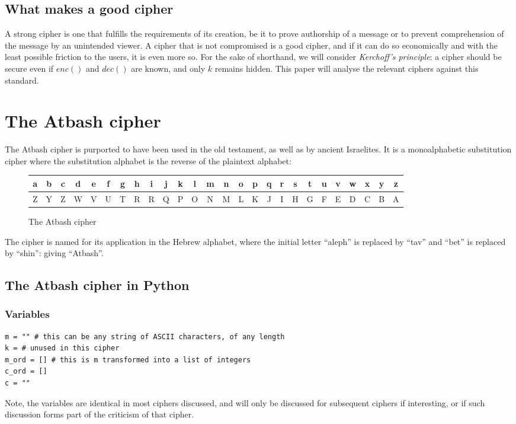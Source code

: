 \documentclass{AIAA}
\begin{document}
\subsection{What makes a good cipher}

A strong cipher is one that fulfills the requirements of its creation, be it to prove authorship of a message or to prevent comprehension of the message by an unintended viewer. A cipher that is not compromised is a good cipher, and if it can do so economically and with the least possible friction to the users, it is even more so. For the sake of shorthand, we will consider \textit{Kerchoff's principle}: a cipher should be secure even if $enc()$ and $dec()$ are known, and only $k$ remains hidden. This paper will analyse the relevant ciphers against this standard.



\section{The Atbash cipher}
The Atbash cipher is purported to have been used in the old testament, as well as by ancient Israelites. It is a monoalphabetic substitution cipher where the substitution alphabet is the reverse of the plaintext alphabet:

\begin{figure}[h!]
\begin{tabular}{|c|c|c|c|c|c|c|c|c|c|c|c|c|c|c|c|c|c|c|c|c|c|c|c|c|c|}
\hline
a & b & c & d & e & f & g & h & i & j & k & l & m & n & o & p & q & r & s & t & u & v & w & x & y & z \\ \hline
Z & Y & Z & W & V & U & T & R & R & Q & P & O & N & M & L & K & J & I & H & G & F & E & D & C & B & A \\
\hline
\end{tabular}
\caption{The Atbash cipher}
\end{figure}

The cipher is named for its application in the Hebrew alphabet, where the initial letter ``aleph'' is replaced by ``tav'' and ``bet'' is replaced by ``shin'': giving ``Atbash''. 

\subsection{The Atbash cipher in Python}

\subsubsection{Variables}
\begin{verbatim}
m = "" # this can be any string of ASCII characters, of any length
k = # unused in this cipher
m_ord = [] # this is m transformed into a list of integers
c_ord = []
c = ""
\end{verbatim}
Note, the variables are identical in most ciphers discussed, and will only be discussed for subsequent ciphers if interesting, or if such discussion forms part of the criticism of that cipher.
\end{document}
